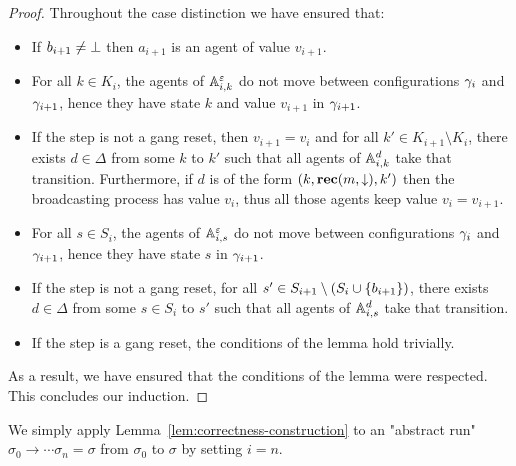\begin{proof}
	Throughout the case distinction we have ensured that:
	\begin{itemize}
		\item If $b_{i+1} \neq \bot$ then $a_{i+1}$ is an agent of value $v_{i+1}$.
		
		\item For all $k \in K_{i}$, the agents of $\mathbb{A}_{i,k}^\varepsilon$ do not move between configurations $\gamma_{i}$ and $\gamma_{i+1}$, hence they have state $k$ and value $v_{i+1}$ in $\gamma_{i+1}$.
		
		\item If the step is not a gang reset, then $v_{i+1} = v_i$ and for all $k' \in K_{i+1} \setminus K_i$, there exists $d \in \Delta$ from some $k$ to $k'$ such that all agents of $\mathbb{A}_{i,k}^d$ take that transition. Furthermore, if $d$ is of the form $(k,\textbf{rec}(m, \downarrow),k')$ then the broadcasting process has value $v_i$, thus all those agents keep value $v_i = v_{i+1}$. 
		
		\item For all $s \in S_{i}$, the agents of $\mathbb{A}_{i,s}^\varepsilon$ do not move between configurations $\gamma_{i}$ and $\gamma_{i+1}$, hence they have state $s$ in $\gamma_{i+1}$.
		
		\item If the step is not a gang reset, for all $s' \in S_{i+1} \setminus (S_i \cup \{b_{i+1}\})$, there exists $d \in \Delta$ from some $s \in S_i$ to $s'$ such that all agents of $\mathbb{A}_{i,s}^d$ take that transition.
		
		\item If the step is a gang reset, the conditions of the lemma hold trivially.
	\end{itemize}
	
	As a result, we have ensured that the conditions of the lemma were respected.
	This concludes our induction.
\end{proof}


	We simply apply Lemma~\ref{lem:correctness-construction} to an "abstract run" $\sigma_0 \to \cdots \sigma_n = \sigma$ from $\sigma_0$ to $\sigma$ by setting $i = n$.

